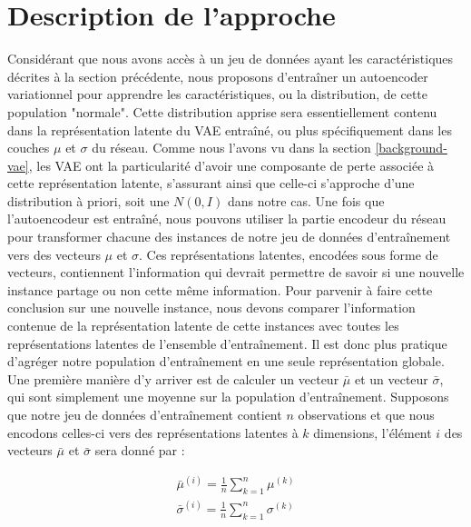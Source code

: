 \section{Description de l'approche}

Considérant que nous avons accès à un jeu de données ayant les caractéristiques décrites à la section précédente, nous proposons d'entraîner un autoencoder variationnel pour apprendre les caractéristiques, ou la distribution, de cette population "normale". Cette distribution apprise sera essentiellement contenu dans la représentation latente du VAE entraîné, ou plus spécifiquement dans les couches $\mu$ et $\sigma$ du réseau. Comme nous l'avons vu dans la section \ref{background-vae}, les VAE ont la particularité d'avoir une composante de perte associée à cette représentation latente, s'assurant ainsi que celle-ci s'approche d'une distribution à priori, soit une $N(0, I)$ dans notre cas. Une fois que l'autoencodeur est entraîné, nous pouvons utiliser la partie encodeur du réseau pour transformer chacune des instances de notre jeu de données d'entraînement vers des  vecteurs $\mu$ et $\sigma$. Ces représentations latentes, encodées sous forme de vecteurs, contiennent l'information qui devrait permettre de savoir si une nouvelle instance partage ou non cette même information. Pour parvenir à faire cette conclusion sur une nouvelle instance, nous devons comparer l'information contenue de la représentation latente de cette instances avec toutes les représentations latentes de l'ensemble d'entraînement. Il est donc plus pratique d'agréger notre population d'entraînement en une seule représentation globale. Une première manière d'y arriver est de calculer un vecteur $\bar{\mu}$ et un vecteur $\bar{\sigma}$, qui sont simplement une moyenne sur la population d'entraînement. Supposons que notre jeu de données d'entraînement contient $n$ observations et que nous encodons celles-ci vers des représentations latentes à $k$ dimensions, l'élément $i$ des vecteurs $\bar{\mu}$ et $\bar{\sigma}$ sera donné par :

\begin{gather*}
\bar{\mu}^{(i)} = \frac{1}{n} \sum_{k=1}^{n} \mu^{(k)} \\
\bar{\sigma}^{(i)} = \frac{1}{n} \sum_{k=1}^{n} \sigma^{(k)}
\end{gather*}

